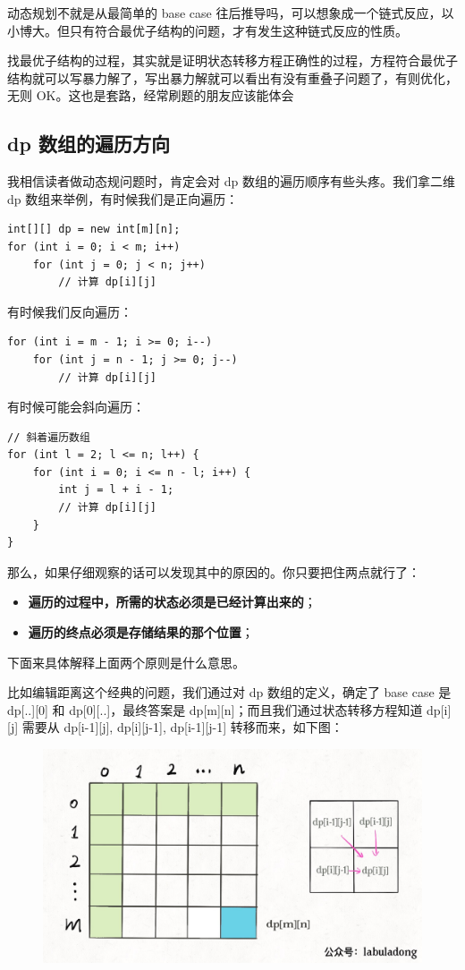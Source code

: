 \documentclass[12pt]{article}
\begin{document}
动态规划不就是从最简单的 base case 往后推导吗，可以想象成一个链式反应，以小博大。但只有符合最优子结构的问题，才有发生这种链式反应的性质。

找最优子结构的过程，其实就是证明状态转移方程正确性的过程，方程符合最优子结构就可以写暴力解了，写出暴力解就可以看出有没有重叠子问题了，有则优化，无则 OK。这也是套路，经常刷题的朋友应该能体会

\subsection{dp 数组的遍历方向}
我相信读者做动态规问题时，肯定会对 dp 数组的遍历顺序有些头疼。我们拿二维 dp 数组来举例，有时候我们是正向遍历：
\begin{lstlisting}
int[][] dp = new int[m][n];
for (int i = 0; i < m; i++)
    for (int j = 0; j < n; j++)
        // 计算 dp[i][j]
\end{lstlisting}

有时候我们反向遍历：
\begin{lstlisting}
for (int i = m - 1; i >= 0; i--)
    for (int j = n - 1; j >= 0; j--)
        // 计算 dp[i][j]
\end{lstlisting}

有时候可能会斜向遍历：
\begin{lstlisting}
// 斜着遍历数组
for (int l = 2; l <= n; l++) {
    for (int i = 0; i <= n - l; i++) {
        int j = l + i - 1;
        // 计算 dp[i][j]
    }
}
\end{lstlisting}

那么，如果仔细观察的话可以发现其中的原因的。你只要把住两点就行了：
\begin{itemize}
\setlength{\itemsep}{0pt}
\setlength{\parsep}{0pt}
\setlength{\parskip}{0pt}
    \item \textbf{遍历的过程中，所需的状态必须是已经计算出来的}；
    \item \textbf{遍历的终点必须是存储结果的那个位置}；
\end{itemize}

下面来具体解释上面两个原则是什么意思。

比如编辑距离这个经典的问题，我们通过对 dp 数组的定义，确定了 base case 是 dp[..][0] 和 dp[0][..]，最终答案是 dp[m][n]；而且我们通过状态转移方程知道 dp[i][j] 需要从 dp[i-1][j], dp[i][j-1], dp[i-1][j-1] 转移而来，如下图：
\begin{figure}[H]
    \centering
    \includegraphics[width=1\textwidth]{fig/Dynamic_Programming_Optimal_Substructure_1.jpg}
\end{figure}
\end{document}
